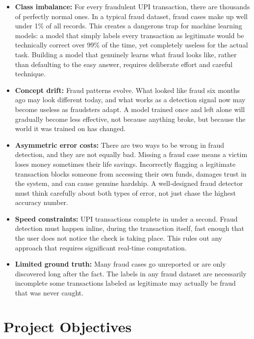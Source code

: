 \begin{itemize}
    \item \textbf{Class imbalance:} For every fraudulent UPI transaction, there are thousands of perfectly normal ones. In a typical fraud dataset, fraud cases make up well under 1\% of all records. This creates a dangerous trap for machine learning models: a model that simply labels every transaction as legitimate would be technically correct over 99\% of the time, yet completely useless for the actual task. Building a model that genuinely learns what fraud looks like, rather than defaulting to the easy answer, requires deliberate effort and careful technique.

    \item \textbf{Concept drift:} Fraud patterns evolve. What looked like fraud six months ago may look different today, and what works as a detection signal now may become useless as fraudsters adapt. A model trained once and left alone will gradually become less effective, not because anything broke, but because the world it was trained on has changed.

    \item \textbf{Asymmetric error costs:} There are two ways to be wrong in fraud detection, and they are not equally bad. Missing a fraud case means a victim loses money sometimes their life savings. Incorrectly flagging a legitimate transaction blocks someone from accessing their own funds, damages trust in the system, and can cause genuine hardship. A well-designed fraud detector must think carefully about both types of error, not just chase the highest accuracy number.

    \item \textbf{Speed constraints:} UPI transactions complete in under a second. Fraud detection must happen inline, during the transaction itself, fast enough that the user does not notice the check is taking place. This rules out any approach that requires significant real-time computation.

    \item \textbf{Limited ground truth:} Many fraud cases go unreported or are only discovered long after the fact. The labels in any fraud dataset are necessarily incomplete some transactions labeled as legitimate may actually be fraud that was never caught.
\end{itemize}

\section{Project Objectives}

